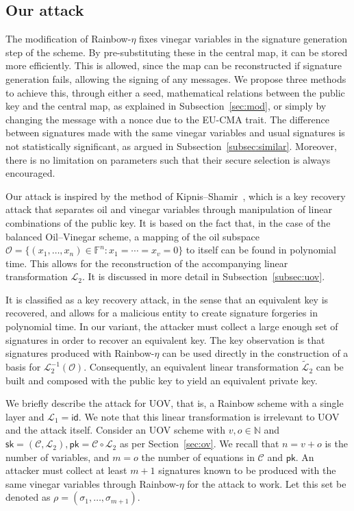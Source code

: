 \documentclass[12pt, a4paper, oneside]{memoir}
\theoremstyle{definition}
\begin{document}
\subsection{Our attack}\label{subsec:etaks}

The modification of Rainbow-$\eta$ fixes vinegar variables in the signature generation step of the scheme. By pre-substituting these in the central map, it can be stored more efficiently. This is allowed, since the map can be reconstructed if signature generation fails, allowing the signing of any messages. We propose three methods to achieve this, through either a seed, mathematical relations between the public key and the central map, as explained in Subsection~\ref{sec:mod}, or simply by changing the message with a nonce due to the EU-CMA trait. The difference between signatures made with the same vinegar variables and usual signatures is not statistically significant, as argued in Subsection~\ref{subsec:similar}. Moreover, there is no limitation on parameters such that their secure selection is always encouraged.



Our attack is inspired by the method of Kipnis--Shamir~\cite{Kipnis:199808}, which is a key recovery attack that separates oil and vinegar variables through manipulation of linear combinations of the public key. It is based on the fact that, in the case of the balanced Oil--Vinegar scheme, a mapping of the oil subspace $\mathcal{O} = \{ (x_{1}, \dots, x_{n}) \in \mathbb{F}^{n} : x_{1} = \cdots = x_{v} = 0 \}$ to itself can be found in polynomial time. This allows for the reconstruction of the accompanying linear transformation $\mathcal{L}_{2}$. It is discussed in more detail in Subsection~\ref{subsec:uov}.

It is classified as a key recovery attack, in the sense that an equivalent key is recovered, and allows for a malicious entity to create signature forgeries in polynomial time. In our variant, the attacker must collect a large enough set of signatures in order to recover an equivalent key. The key observation is that signatures produced with Rainbow-$\eta$ can be used directly in the construction of a basis for $\mathcal{L}_{2}^{-1}(\mathcal{O})$. Consequently, an equivalent linear transformation $\widetilde{\mathcal{L}}_{2}$ can be built and composed with the public key to yield an equivalent private key.

We briefly describe the attack for UOV, that is, a Rainbow scheme with a single layer and $\mathcal{L}_{1} = \textsf{id}$. We note that this linear transformation is irrelevant to UOV and the attack itself. Consider an UOV scheme with $v, o \in \mathbb{N}$ and $\mathsf{sk} = (\mathcal{C}, \mathcal{L}_{2}), \mathsf{pk} = \mathcal{C} \circ \mathcal{L}_{2}$ as per Section~\ref{sec:ov}. We recall that $n = v + o$ is the number of variables, and $m = o$ the number of equations in $\mathcal{C}$ and $\mathsf{pk}$. An attacker must collect at least $m + 1$ signatures known to be produced with the same vinegar variables through Rainbow-$\eta$ for the attack to work. Let this set be denoted as $\rho = (\sigma_{1}, \dots, \sigma_{m + 1})$. 
\end{document}
